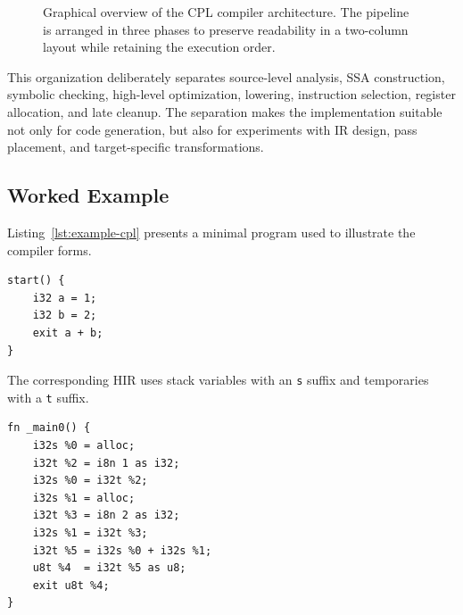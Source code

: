 \documentclass[10pt,twocolumn]{article}
\begin{document}
\begin{figure}[t]
{%
}
\caption{Graphical overview of the CPL compiler architecture. The pipeline is arranged in three phases to preserve readability in a two-column layout while retaining the execution order.}
\label{fig:compiler-pipeline}
\end{figure}

\par This organization deliberately separates source-level analysis, SSA construction, symbolic checking, high-level optimization, lowering, instruction selection, register allocation, and late cleanup. The separation makes the implementation suitable not only for code generation, but also for experiments with IR design, pass placement, and target-specific transformations.

\subsection{Worked Example}

\par Listing~\ref{lst:example-cpl} presents a minimal program used to illustrate the compiler forms.

\begin{lstlisting}[language=CPL,caption={Input CPL program.},label={lst:example-cpl}]
start() {
    i32 a = 1;
    i32 b = 2;
    exit a + b;
}
\end{lstlisting}

\par The corresponding HIR uses stack variables with an \texttt{s} suffix and temporaries with a \texttt{t} suffix.

\begin{lstlisting}[caption={High IR (HIR) form for Listing~\ref{lst:example-cpl}.}]
fn _main0() {
    i32s %0 = alloc;
    i32t %2 = i8n 1 as i32;
    i32s %0 = i32t %2;
    i32s %1 = alloc;
    i32t %3 = i8n 2 as i32;
    i32s %1 = i32t %3;
    i32t %5 = i32s %0 + i32s %1;
    u8t %4  = i32t %5 as u8;
    exit u8t %4;
}
\end{lstlisting}
\end{document}
